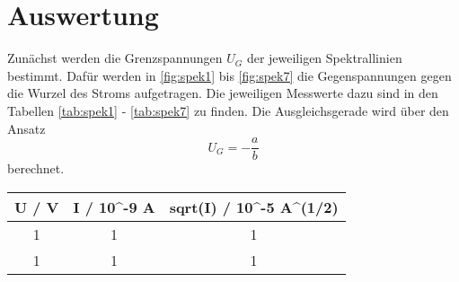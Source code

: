 \section{Auswertung}
\label{sec:Auswertung}

Zunächst werden die Grenzspannungen $U_G$ der jeweiligen Spektrallinien bestimmt.
Dafür werden in \autoref{fig:spek1} bis \autoref{fig:spek7} die Gegenspannungen gegen die Wurzel des Stroms aufgetragen.
Die jeweiligen Messwerte dazu sind in den Tabellen \ref{tab:spek1} - \ref{tab:spek7} zu finden.
Die Ausgleichsgerade wird über den Ansatz 
\begin{equation*}
  U_G = - \frac{a}{b}
\end{equation*}
berechnet.

\begin{tabular}{c c c}
  \toprule
   U / V &  I / 10\textasciicircum -9 A &  sqrt(I) / 10\textasciicircum -5 A\textasciicircum (1/2) \\
  \midrule
       1 &            1 &                        1 \\
       1 &            1 &                        1 \\
  \bottomrule
\end{tabular}